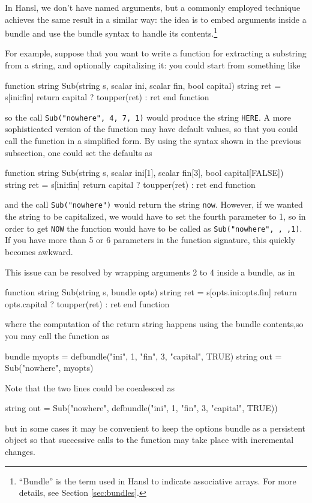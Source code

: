 In Hansl, we don't have named arguments, but a commonly employed
technique achieves the same result in a similar way: the idea is to
embed arguments inside a bundle and use the bundle syntax to handle
its contents.\footnote{``Bundle'' is the term used in Hansl to
  indicate associative arrays. For more details, see
  Section \ref{sec:bundles}.}

For example, suppose that you want to write a function for extracting
a substring from a string, and optionally capitalizing it: you could
start from something like
\begin{code}
function string Sub(string s, scalar ini, scalar fin, bool capital)
    string ret = s[ini:fin]
    return capital ? toupper(ret) : ret
end function
\end{code}
so the call \texttt{Sub("nowhere", 4, 7, 1)} would produce the string
\texttt{HERE}. A more sophisticated version of the function may have
default values, so that you could call the function in a simplified
form. By using the syntax shown in the previous subsection, one could
set the defaults as
\begin{code}
function string Sub(string s, scalar ini[1], scalar fin[3], bool capital[FALSE])
    string ret = s[ini:fin]
    return capital ? toupper(ret) : ret
end function
\end{code}
and the call \texttt{Sub("nowhere")} would return the string
\texttt{now}. However, if we wanted the string to be capitalized, we
would have to set the fourth parameter to 1, so in order to get
\texttt{NOW} the function would have to be called as
\texttt{Sub("nowhere", , ,1)}. If you have more than 5 or 6 parameters
in the function signature, this quickly becomes awkward.

This issue can be resolved by wrapping arguments 2 to 4 inside a
bundle, as in
\begin{code}
function string Sub(string s, bundle opts)
    string ret = s[opts.ini:opts.fin]
    return opts.capital ? toupper(ret) : ret
end function
\end{code}
where the computation of the return string happens using the bundle
contents,so you may call the function as
\begin{code}
  bundle myopts = defbundle("ini", 1, "fin", 3, "capital", TRUE)
  string out = Sub("nowhere", myopts)
\end{code}
Note that the two lines could be coealesced as
\begin{code}
  string out = Sub("nowhere", defbundle("ini", 1, "fin", 3,
                                        "capital", TRUE))
\end{code}
but in some cases it may be convenient to keep the options bundle as a
persistent object so that successive calls to the function may take
place with incremental changes.

